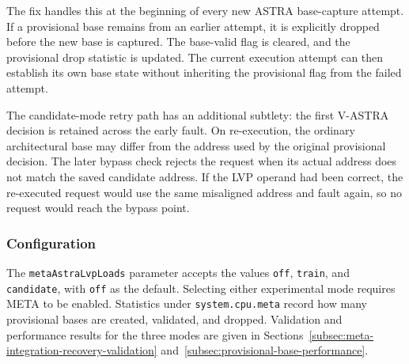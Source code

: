 The fix handles this at the beginning of every new ASTRA
base-capture attempt. If a provisional base remains from an
earlier attempt, it is explicitly dropped before the new base
is captured. The base-valid flag is cleared, and the provisional
drop statistic is updated. The current execution attempt can
then establish its own base state without inheriting the
provisional flag from the failed attempt.

The candidate-mode retry path has an additional subtlety:
the first V-ASTRA decision is retained across the early fault.
On re-execution, the ordinary architectural base may differ
from the address used by the original provisional decision.
The later bypass check rejects the request when its actual
address does not match the saved candidate address. If the LVP
operand had been correct, the re-executed request would use the
same misaligned address and fault again, so no request would reach
the bypass point.

\subsubsection{Configuration}

The \texttt{metaAstraLvpLoads} parameter accepts the values
\texttt{off}, \texttt{train}, and \texttt{candidate}, with
\texttt{off} as the default. Selecting either experimental mode
requires META to be enabled. Statistics under
\texttt{system.cpu.meta} record how many provisional bases are
created, validated, and dropped. Validation and performance results
for the three modes are given in
Sections~\ref{subsec:meta-integration-recovery-validation}
and~\ref{subsec:provisional-base-performance}.
